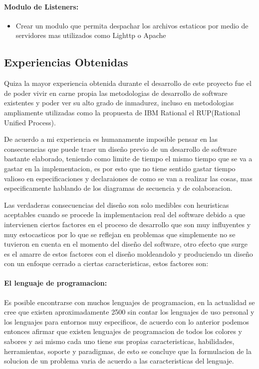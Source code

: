 \paragraph{Modulo de Listeners:}

\begin{itemize}
	\item Crear un modulo que permita despachar los archivos estaticos por medio de servidores mas utilizados como Lighttp \cite{lighttp} o Apache \cite{apache}
\end{itemize}


\subsection{Experiencias Obtenidas}

Quiza la mayor experiencia obtenida durante el desarrollo de este proyecto fue el de poder vivir en carne propia las metodologias de desarrollo de software existentes y poder ver su alto grado de inmadurez, incluso en metodologias ampliamente utilizadas como la propuesta de IBM Rational el RUP(Rational Unified Process).

De acuerdo a mi experiencia es humanamente imposible pensar en las consecuencias que puede traer un diseño previo de un desarrollo de software bastante elaborado, teniendo como limite de tiempo el mismo tiempo que se va a gastar en la implementacion, es por esto que no tiene sentido gastar tiempo valioso en especificaciones y declaraiones de como se van a realizar las cosas, mas especificamente hablando de los diagramas de secuencia y de colaboracion.

Las verdaderas consecuencias del diseño son solo medibles con heuristicas aceptables cuando se procede la implementacion real del software debido a que intervienen ciertos factores en el proceso de desarrollo que son muy influyentes y muy estocasticos por lo que se reflejan en problemas que simplemente no se tuvieron en cuenta en el momento del diseño del software, otro efecto que surge es el amarre de estos factores con el diseño moldeandolo y produciendo un diseño con un enfoque cerrado a ciertas caracteristicas, estos factores son:

\paragraph{El lenguaje de programacion:}
Es posible encontrarse con muchos lenguajes de programacion, en la actualidad se cree que existen aproximadamente 2500 \cite{bd_lenguajes_programacion} sin contar los lenguajes de uso personal y los lenguajes para entornos muy especificos, de acuerdo con lo anterior podemos entonces afirmar que existen lenguajes de programacion de todos los colores y sabores y asi mismo cada uno tiene sus propias caracteristicas, habilidades, herramientas, soporte y paradigmas, de esto se concluye que la formulacion de la solucion de un problema varia de acuerdo a las caracteristicas del lenguaje.



